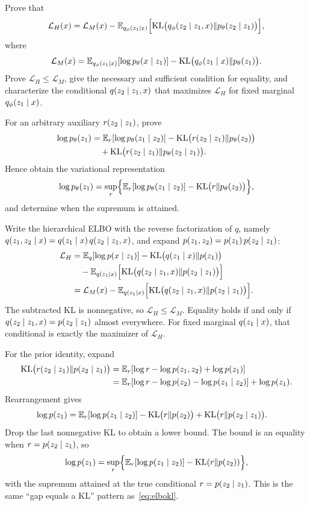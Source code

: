 \begin{hwqbox}
Prove that
\[
\mathcal L_H(x)
=\mathcal L_M(x)
-\mathbb{E}_{q_\phi(z_1\mid x)}\Bigl[
\mathrm{KL}\bigl(q_\phi(z_2\mid z_1,x)\Vert p_\theta(z_2\mid z_1)\bigr)
\Bigr],
\]
where
\[
\mathcal L_M(x)
=\mathbb{E}_{q_\phi(z_1\mid x)}[\log p_\theta(x\mid z_1)]
-\mathrm{KL}\bigl(q_\phi(z_1\mid x)\Vert p_\theta(z_1)\bigr).
\]
Prove $\mathcal L_H\le\mathcal L_M$, give the necessary and sufficient condition for equality, and characterize the conditional $q(z_2\mid z_1,x)$ that maximizes $\mathcal L_H$ for fixed marginal $q_\phi(z_1\mid x)$.

For an arbitrary auxiliary $r(z_2\mid z_1)$, prove
\begin{align*}
\log p_\theta(z_1)
&=\mathbb{E}_r[\log p_\theta(z_1\mid z_2)]
-\mathrm{KL}\bigl(r(z_2\mid z_1)\Vert p_\theta(z_2)\bigr)\\
&\quad+\mathrm{KL}\bigl(r(z_2\mid z_1)\Vert p_\theta(z_2\mid z_1)\bigr).
\end{align*}
Hence obtain the variational representation
\[
\log p_\theta(z_1)
=\sup_r\Bigl\{
\mathbb{E}_r[\log p_\theta(z_1\mid z_2)]
-\mathrm{KL}\bigl(r\Vert p_\theta(z_2)\bigr)
\Bigr\},
\]
and determine when the supremum is attained.
\end{hwqbox}
\begin{hwsolbox}
Write the hierarchical ELBO with the reverse factorization of $q$, namely
$q(z_1,z_2\mid x)=q(z_1\mid x)\,q(z_2\mid z_1,x)$, and expand
$p(z_1,z_2)=p(z_1)\,p(z_2\mid z_1)$:
\begin{align*}
\mathcal L_H
&=\mathbb{E}_q[\log p(x\mid z_1)]
-\mathrm{KL}\bigl(q(z_1\mid x)\Vert p(z_1)\bigr)\\
&\quad-\mathbb{E}_{q(z_1\mid x)}\Bigl[
\mathrm{KL}\bigl(q(z_2\mid z_1,x)\Vert p(z_2\mid z_1)\bigr)
\Bigr]\\
&=\mathcal L_M(x)
-\mathbb{E}_{q(z_1\mid x)}\Bigl[
\mathrm{KL}\bigl(q(z_2\mid z_1,x)\Vert p(z_2\mid z_1)\bigr)
\Bigr].
\end{align*}
The subtracted KL is nonnegative, so $\mathcal L_H\le\mathcal L_M$. Equality holds if and only if
$q(z_2\mid z_1,x)=p(z_2\mid z_1)$ almost everywhere.
For fixed marginal $q(z_1\mid x)$, that conditional is exactly the maximizer of $\mathcal L_H$.

For the prior identity, expand
\begin{align*}
\mathrm{KL}\bigl(r(z_2\mid z_1)\Vert p(z_2\mid z_1)\bigr)
&=\mathbb{E}_r[\log r-\log p(z_1,z_2)+\log p(z_1)]\\
&=\mathbb{E}_r[\log r-\log p(z_2)-\log p(z_1\mid z_2)]+\log p(z_1).
\end{align*}
Rearrangement gives
\begin{align*}
\log p(z_1)
&=\mathbb{E}_r[\log p(z_1\mid z_2)]
-\mathrm{KL}\bigl(r\Vert p(z_2)\bigr)
+\mathrm{KL}\bigl(r\Vert p(z_2\mid z_1)\bigr).
\end{align*}
Drop the last nonnegative KL to obtain a lower bound. The bound is an equality when $r=p(z_2\mid z_1)$, so
\[
\log p(z_1)
=\sup_r\Bigl\{
\mathbb{E}_r[\log p(z_1\mid z_2)]-\mathrm{KL}(r\Vert p(z_2))
\Bigr\},
\]
with the supremum attained at the true conditional $r=p(z_2\mid z_1)$. This is the same ``gap equals a KL'' pattern as~\eqref{eq:elbokl}.
\end{hwsolbox}
